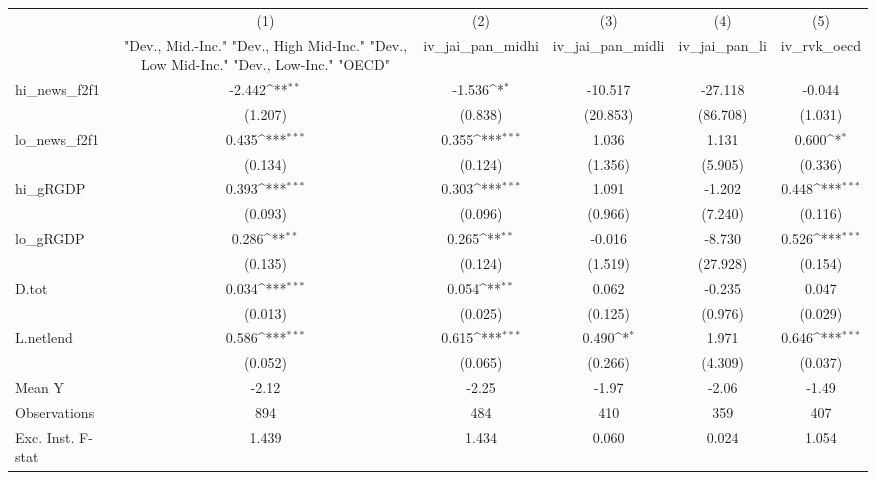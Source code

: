 {
\def\sym#1{\ifmmode^{#1}\else\(^{#1}\)\fi}
\begin{tabular}{l*{5}{c}}
\toprule
            &\multicolumn{1}{c}{(1)}&\multicolumn{1}{c}{(2)}&\multicolumn{1}{c}{(3)}&\multicolumn{1}{c}{(4)}&\multicolumn{1}{c}{(5)}\\
            &\multicolumn{1}{c}{ "Dev., Mid.-Inc." "Dev., High Mid-Inc." "Dev., Low Mid-Inc." "Dev., Low-Inc." "OECD" }&\multicolumn{1}{c}{iv\_jai\_pan\_midhi}&\multicolumn{1}{c}{iv\_jai\_pan\_midli}&\multicolumn{1}{c}{iv\_jai\_pan\_li}&\multicolumn{1}{c}{iv\_rvk\_oecd}\\
\midrule
hi\_news\_f2f1&      -2.442\sym{**} &      -1.536\sym{*}  &     -10.517         &     -27.118         &      -0.044         \\
            &     (1.207)         &     (0.838)         &    (20.853)         &    (86.708)         &     (1.031)         \\
\addlinespace
lo\_news\_f2f1&       0.435\sym{***}&       0.355\sym{***}&       1.036         &       1.131         &       0.600\sym{*}  \\
            &     (0.134)         &     (0.124)         &     (1.356)         &     (5.905)         &     (0.336)         \\
\addlinespace
hi\_gRGDP    &       0.393\sym{***}&       0.303\sym{***}&       1.091         &      -1.202         &       0.448\sym{***}\\
            &     (0.093)         &     (0.096)         &     (0.966)         &     (7.240)         &     (0.116)         \\
\addlinespace
lo\_gRGDP    &       0.286\sym{**} &       0.265\sym{**} &      -0.016         &      -8.730         &       0.526\sym{***}\\
            &     (0.135)         &     (0.124)         &     (1.519)         &    (27.928)         &     (0.154)         \\
\addlinespace
D.tot       &       0.034\sym{***}&       0.054\sym{**} &       0.062         &      -0.235         &       0.047         \\
            &     (0.013)         &     (0.025)         &     (0.125)         &     (0.976)         &     (0.029)         \\
\addlinespace
L.netlend   &       0.586\sym{***}&       0.615\sym{***}&       0.490\sym{*}  &       1.971         &       0.646\sym{***}\\
            &     (0.052)         &     (0.065)         &     (0.266)         &     (4.309)         &     (0.037)         \\
\midrule
Mean Y      &       -2.12         &       -2.25         &       -1.97         &       -2.06         &       -1.49         \\
Observations&         894         &         484         &         410         &         359         &         407         \\
Exc. Inst. F-stat&       1.439         &       1.434         &       0.060         &       0.024         &       1.054         \\
\bottomrule
\end{tabular}
}
